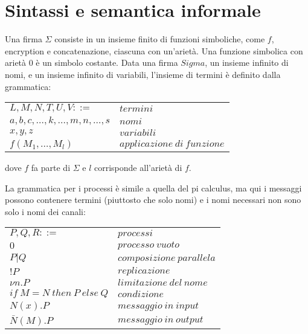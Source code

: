 \section{Sintassi e semantica informale}

Una firma $\Sigma$ consiste in un insieme finito di funzioni simboliche, come $f$, encryption e concatenazione, ciascuna con un'arietà. Una funzione simbolica con arietà 0 è un simbolo costante.
Data una firma $Sigma$, un insieme infinito di nomi, e un insieme infinito di variabili, l'insieme di termini è definito dalla grammatica:


    \begin{table}[h!]
        \begin{tabular}{ll}
            
            $L, M, N, T, U, V ::=$ & $termini$\\
            \quad$a, b, c, \dots , k, \dots , m, n, \dots , s$ & $nomi$\\
            \quad$x, y, z$ & $variabili$\\
            \quad$f(M_1, \dots , M_l)$ & $applicazione \: di \: funzione$
           
        \end{tabular}
    \end{table}

    \newpage
    \noindent dove $f$ fa parte di $\Sigma$ e $l$ corrisponde all'arietà di $f$.
    
    
    La grammatica per i processi è simile a quella del pi calculus, ma qui i messaggi possono contenere termini (piuttosto che solo nomi) e i nomi necessari non sono solo i nomi dei canali:
    \begin{table}[h!]
        \begin{tabular}{ll}
            
            $P, Q, R ::=$ & $processi$\\
            \quad$0$ & $processo \: vuoto$\\
            \quad$P|Q$ & $composizione \: parallela$\\
            \quad$!P$ & $replicazione$\\
            \quad$\nu n.P$ & $limitazione \: del \: nome$\\
            \quad$if \: M = N \: then \: P \: else \: Q$ & $condizione$\\
            \quad$N(x).P$ & $messaggio \: in \: input$\\
            \quad$\bar{N}(M).P$ & $messaggio \: in \: output$

           
        \end{tabular}
    \end{table}

